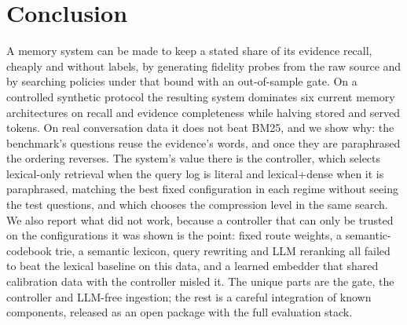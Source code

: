 \documentclass[journal]{IEEEtran}
\begin{document}
\section{Conclusion}
A memory system can be made to keep a stated share of its evidence recall, cheaply and without labels, by generating fidelity probes from the raw source and by searching policies under that bound with an out-of-sample gate. On a controlled synthetic protocol the resulting system dominates six current memory architectures on recall and evidence completeness while halving stored and served tokens. On real conversation data it does not beat BM25, and we show why: the benchmark's questions reuse the evidence's words, and once they are paraphrased the ordering reverses. The system's value there is the controller, which selects lexical-only retrieval when the query log is literal and lexical+dense when it is paraphrased, matching the best fixed configuration in each regime without seeing the test questions, and which chooses the compression level in the same search. We also report what did not work, because a controller that can only be trusted on the configurations it was shown is the point: fixed route weights, a semantic-codebook trie, a semantic lexicon, query rewriting and LLM reranking all failed to beat the lexical baseline on this data, and a learned embedder that shared calibration data with the controller misled it. The unique parts are the gate, the controller and LLM-free ingestion; the rest is a careful integration of known components, released as an open package with the full evaluation stack.
\end{document}
